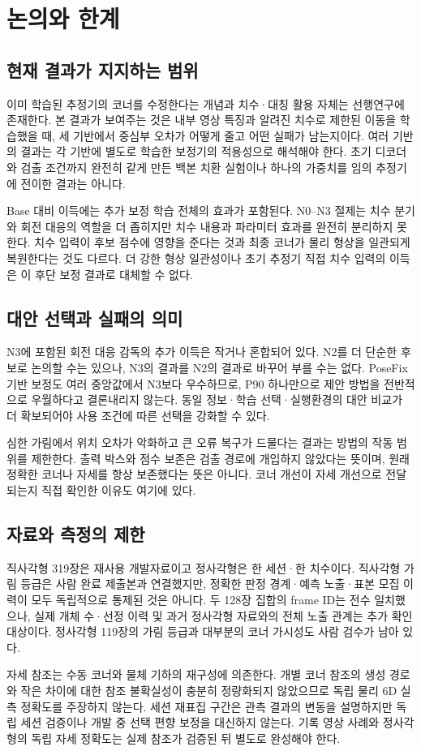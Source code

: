 \section{논의와 한계}\label{sec:discussion}
\subsection{현재 결과가 지지하는 범위}
이미 학습된 추정기의 코너를 수정한다는 개념과 치수·대칭 활용 자체는 선행연구에 존재한다. 본 결과가 보여주는 것은 내부 영상 특징과 알려진 치수로 제한된 이동을 학습했을 때, 세 기반에서 중심부 오차가 어떻게 줄고 어떤 실패가 남는지이다. 여러 기반의 결과는 각 기반에 별도로 학습한 보정기의 적용성으로 해석해야 한다. 초기 디코더와 검출 조건까지 완전히 같게 만든 백본 치환 실험이나 하나의 가중치를 임의 추정기에 전이한 결과는 아니다.

Base 대비 이득에는 추가 보정 학습 전체의 효과가 포함된다. N0--N3 절제는 치수 분기와 회전 대응의 역할을 더 좁히지만 치수 내용과 파라미터 효과를 완전히 분리하지 못한다. 치수 입력이 후보 점수에 영향을 준다는 것과 최종 코너가 물리 형상을 일관되게 복원한다는 것도 다르다. 더 강한 형상 일관성이나 초기 추정기 직접 치수 입력의 이득은 이 후단 보정 결과로 대체할 수 없다.

\subsection{대안 선택과 실패의 의미}
N3에 포함된 회전 대응 감독의 추가 이득은 작거나 혼합되어 있다. N2를 더 단순한 후보로 논의할 수는 있으나, N3의 결과를 N2의 결과로 바꾸어 부를 수는 없다. PoseFix 기반 보정도 여러 중앙값에서 N3보다 우수하므로, P90 하나만으로 제안 방법을 전반적으로 우월하다고 결론내리지 않는다. 동일 정보·학습 선택·실행환경의 대안 비교가 더 확보되어야 사용 조건에 따른 선택을 강화할 수 있다.

심한 가림에서 위치 오차가 악화하고 큰 오류 복구가 드물다는 결과는 방법의 작동 범위를 제한한다. 출력 박스와 점수 보존은 검출 경로에 개입하지 않았다는 뜻이며, 원래 정확한 코너나 자세를 항상 보존했다는 뜻은 아니다. 코너 개선이 자세 개선으로 전달되는지 직접 확인한 이유도 여기에 있다.

\subsection{자료와 측정의 제한}
직사각형 319장은 재사용 개발자료이고 정사각형은 한 세션·한 치수이다. 직사각형 가림 등급은 사람 완료 제출본과 연결했지만, 정확한 판정 경계·예측 노출·표본 모집 이력이 모두 독립적으로 통제된 것은 아니다. 두 128장 집합의 frame ID는 전수 일치했으나, 실제 개체 수·선정 이력 및 과거 정사각형 자료와의 전체 노출 관계는 추가 확인 대상이다. 정사각형 119장의 가림 등급과 대부분의 코너 가시성도 사람 검수가 남아 있다.

자세 참조는 수동 코너와 물체 기하의 재구성에 의존한다. 개별 코너 참조의 생성 경로와 작은 차이에 대한 참조 불확실성이 충분히 정량화되지 않았으므로 독립 물리 6D 실측 정확도를 주장하지 않는다. 세션 재표집 구간은 관측 결과의 변동을 설명하지만 독립 세션 검증이나 개발 중 선택 편향 보정을 대신하지 않는다. 기록 영상 사례와 정사각형의 독립 자세 정확도는 실제 참조가 검증된 뒤 별도로 완성해야 한다.
